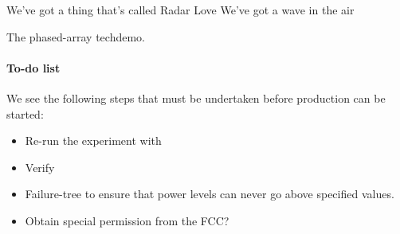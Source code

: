 \documentclass[fleqn,10pt]{article}
\begin{document}
We've got a thing 
that's called 
Radar Love
We've got a wave
in the air

The phased-array techdemo.



	


\clearpage



\paragraph{To-do list}

We see the following steps that must be undertaken before production can be started:

\begin{itemize}
  \item Re-run the experiment with 
  \item Verify 
  \item Failure-tree to ensure that power levels can never go above specified values.
  \item Obtain special permission from the FCC?
\end{itemize}
\end{document}
